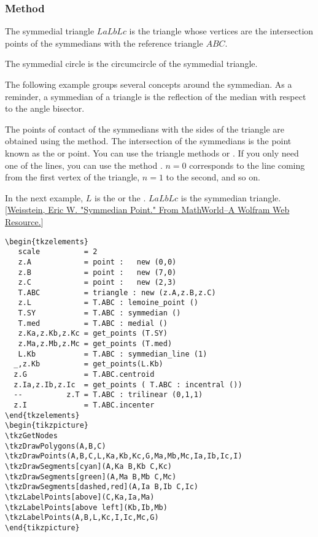 

\subsubsection{Method } %
\label{ssub:method_imeth_triangle_symmedial}

The symmedial triangle $LaLbLc$  is the triangle whose vertices are the intersection points of the symmedians with the reference triangle $ABC$.

The symmedial circle is the circumcircle of the symmedial triangle.

The following example groups several concepts around the symmedian. As a reminder, a symmedian of a triangle is the reflection of the median with respect to the angle bisector.

The points of contact of the symmedians with the sides of the triangle are obtained using the  method.
The intersection of the symmedians is the point known as the  or  point.
You can use the triangle methods  or . If you only need one of the lines, you can use the method . \(n=0\) corresponds to the line coming from the first vertex of the triangle, \(n=1\) to the second, and so on.

In the next example, $L$ is the  or the . $LaLbLc$ is the symmedian triangle.[\href{https://mathworld.wolfram.com/SymmedianPoint.html}{Weisstein, Eric W. "Symmedian Point." From MathWorld--A Wolfram Web Resource.}]

\vspace{6pt}

\begin{minipage}{.5\textwidth}
\begin{Verbatim}
\begin{tkzelements}
   scale          = 2
   z.A            = point :   new (0,0)
   z.B            = point :   new (7,0)
   z.C            = point :   new (2,3)
   T.ABC          = triangle : new (z.A,z.B,z.C)
   z.L            = T.ABC : lemoine_point ()
   T.SY           = T.ABC : symmedian ()
   T.med          = T.ABC : medial ()
   z.Ka,z.Kb,z.Kc = get_points (T.SY)
   z.Ma,z.Mb,z.Mc = get_points (T.med)
   L.Kb           = T.ABC : symmedian_line (1)
  _,z.Kb          = get_points(L.Kb)
  z.G             = T.ABC.centroid
  z.Ia,z.Ib,z.Ic  = get_points ( T.ABC : incentral ())
  --          z.T = T.ABC : trilinear (0,1,1)
  z.I             = T.ABC.incenter
\end{tkzelements}
\begin{tikzpicture}
\tkzGetNodes
\tkzDrawPolygons(A,B,C)
\tkzDrawPoints(A,B,C,L,Ka,Kb,Kc,G,Ma,Mb,Mc,Ia,Ib,Ic,I)
\tkzDrawSegments[cyan](A,Ka B,Kb C,Kc)
\tkzDrawSegments[green](A,Ma B,Mb C,Mc)
\tkzDrawSegments[dashed,red](A,Ia B,Ib C,Ic)
\tkzLabelPoints[above](C,Ka,Ia,Ma)
\tkzLabelPoints[above left](Kb,Ib,Mb)
\tkzLabelPoints(A,B,L,Kc,I,Ic,Mc,G)
\end{tikzpicture}
\end{Verbatim}
\end{minipage}

